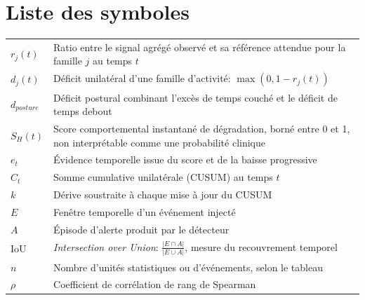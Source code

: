 \chapter*{Liste des symboles}

\begin{tabular}{@{}p{1.7cm}p{\dimexpr\textwidth-1.7cm-2\tabcolsep\relax}@{}}
$r_j(t)$ & Ratio entre le signal agrégé observé et sa référence attendue pour la famille $j$ au temps $t$ \\[3pt]
$d_j(t)$ & Déficit unilatéral d'une famille d'activité: $\max(0,1-r_j(t))$ \\[3pt]
$d_{posture}$ & Déficit postural combinant l'excès de temps couché et le déficit de temps debout \\[3pt]
$S_H(t)$ & Score comportemental instantané de dégradation, borné entre 0 et 1, non interprétable comme une probabilité clinique \\[3pt]
$e_t$ & Évidence temporelle issue du score et de la baisse progressive \\[3pt]
$C_t$ & Somme cumulative unilatérale (CUSUM) au temps $t$ \\[3pt]
$k$ & Dérive soustraite à chaque mise à jour du CUSUM \\[3pt]
$E$ & Fenêtre temporelle d'un événement injecté \\[3pt]
$A$ & Épisode d'alerte produit par le détecteur \\[3pt]
$\mathrm{IoU}$ & \textit{Intersection over Union}: $\frac{|E\cap A|}{|E\cup A|}$, mesure du recouvrement temporel \\[3pt]
$n$ & Nombre d'unités statistiques ou d'événements, selon le tableau \\[3pt]
$\rho$ & Coefficient de corrélation de rang de Spearman \\[3pt]
\end{tabular}
